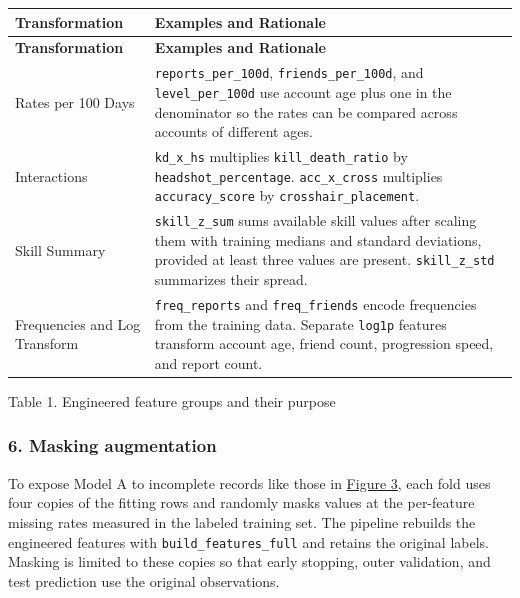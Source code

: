 \documentclass[11pt,a4paper]{article}
\begin{document}
\begingroup\small
\begin{longtable}{@{}L{.22\linewidth}L{.73\linewidth}@{}}
\toprule
\textbf{Transformation} & \textbf{Examples and Rationale} \\
\midrule
\endfirsthead
\toprule
\textbf{Transformation} & \textbf{Examples and Rationale} \\
\midrule
\endhead
\bottomrule
\endfoot
Rates per 100 Days & \texttt{reports\_\allowbreak{}per\_\allowbreak{}100d}, \texttt{friends\_\allowbreak{}per\_\allowbreak{}100d}, and \texttt{level\_\allowbreak{}per\_\allowbreak{}100d} use account age plus one in the denominator so the rates can be compared across accounts of different ages. \\
Interactions & \texttt{kd\_\allowbreak{}x\_\allowbreak{}hs} multiplies \texttt{kill\_\allowbreak{}death\_\allowbreak{}ratio} by \texttt{headshot\_\allowbreak{}percentage}. \texttt{acc\_\allowbreak{}x\_\allowbreak{}cross} multiplies \texttt{accuracy\_\allowbreak{}score} by \texttt{crosshair\_\allowbreak{}placement}. \\
Skill Summary & \texttt{skill\_\allowbreak{}z\_\allowbreak{}sum} sums available skill values after scaling them with training medians and standard deviations, provided at least three values are present. \texttt{skill\_\allowbreak{}z\_\allowbreak{}std} summarizes their spread. \\
Frequencies and Log Transform & \texttt{freq\_\allowbreak{}reports} and \texttt{freq\_\allowbreak{}friends} encode frequencies from the training data. Separate \texttt{log1p} features transform account age, friend count, progression speed, and report count. \\
\end{longtable}
\endgroup

{\centering\small Table 1. Engineered feature groups and their purpose\par}\medskip

\subsubsection*{6. Masking augmentation}

To expose Model A to incomplete records like those in \hyperlink{task1-figure-3}{Figure 3}, each fold uses four copies of the fitting rows and randomly masks values at the per-feature missing rates measured in the labeled training set. The pipeline rebuilds the engineered features with \texttt{build\_\allowbreak{}features\_\allowbreak{}full} and retains the original labels. Masking is limited to these copies so that early stopping, outer validation, and test prediction use the original observations.
\end{document}
